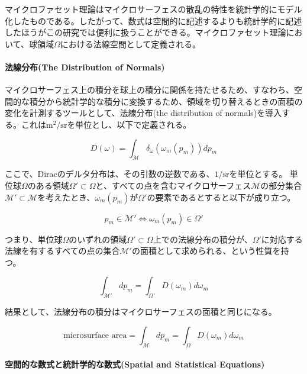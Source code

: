 \documentclass[a4j,xelatex,ja=standard]{bxjsarticle}
\begin{document}
マイクロファセット理論はマイクロサーフェスの散乱の特性を統計学的にモデル化したものである。したがって、数式は空間的に記述するよりも統計学的に記述したほうがこの研究では便利に扱うことができる。マイクロファセット理論において、球領域$\Omega$における法線空間として定義される。

\paragraph{法線分布(The Distribution of Normals)}

マイクロサーフェス上の積分を球上の積分に関係を持たせるため、すなわち、空間的な積分から統計学的な積分に変換するため、領域を切り替えるときの面積の変化を計測するツールとして、法線分布(the distribution of normals)を導入する。これは$\text{m}^2/\text{sr}$を単位とし、以下で定義される。

\begin{equation}
    D(\omega) = \int_{\mathcal M}  \delta_{\omega}(\omega_m(p_m)) dp_m
    \label{eq:2}
\end{equation}

ここで、Diracのデルタ分布は、その引数の逆数である、$1/\text{sr}$を単位とする。
単位球$\Omega$のある領域$\Omega' \subset \Omega$と、すべての点を含むマイクロサーフェス$\mathcal M$の部分集合$\mathcal{M}' \subset \mathcal{M}$を考えたとき、$\omega_m(p_m)$が$\Omega'$の要素であるとすると以下が成り立つ。

\begin{equation}
    p_m \in \mathcal{M}' \iff \omega_m(p_m) \in \Omega'
    \label{eq:3}
\end{equation}

つまり、単位球$\Omega$のいずれの領域$\Omega' \subset \Omega$上での法線分布の積分が、$\Omega'$に対応する法線を有するすべての点の集合$\mathcal M'$の面積として求められる、という性質を持つ。

\begin{equation}
    \int_{\mathcal M'} dp_m = \int_{\Omega'} D(\omega_m)d\omega_m
    \label{eq:4}
\end{equation}

結果として、法線分布の積分はマイクロサーフェスの面積と同じになる。

\begin{equation}
    \text{microsurface area} = \int_{\mathcal M} dp_m = \int_{\Omega} D(\omega_m)d\omega_m
    \label{eq:5}
\end{equation}

\paragraph{空間的な数式と統計学的な数式(Spatial and Statistical Equations)}
\end{document}
